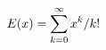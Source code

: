 \documentclass[preview]{standalone}
\begin{document}
\begin{align*}
\special{dvisvgm:raw <g id='unique000'>}E(x)=\sum_{k=0}^{\infty}x^k/k!\special{dvisvgm:raw </g>}
\end{align*}
\end{document}
